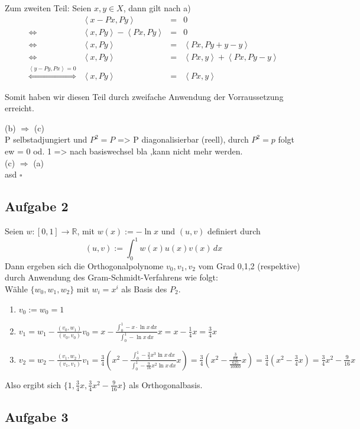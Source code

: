 \documentclass[11pt,a4paper,ngerman]{article}
\begin{document}
Zum zweiten Teil:
Seien $x, y \in X$, dann gilt nach a)
\begin{equation*}\begin{array}{crcl}
& \left\langle x - Px, Py \right\rangle &=& 0\\
\Leftrightarrow &
\left\langle x , Py \right\rangle - \left\langle Px, Py \right\rangle &=& 0\\
\Leftrightarrow &
\left\langle x, Py \right\rangle &=& \left\langle Px, Py + y - y \right\rangle\\
\Leftrightarrow &
\left\langle x , Py \right\rangle &=&
\left\langle Px, y \right\rangle + \left\langle Px, Py - y \right\rangle\\
\stackrel{\left\langle y - Py, Px \right\rangle = 0}{\Leftrightarrow}&
\left\langle x , Py \right\rangle &=& \left\langle Px , y \right\rangle
\end{array}\end{equation*}

Somit haben wir diesen Teil durch zweifache Anwendung der Vorraussetzung erreicht.

(b) $\Rightarrow$ (c) \\
P selbstadjungiert und $P^2 = P$ => P diagonalisierbar (reell), durch $P^2 = p$ folgt ew = 0 od. 1 => nach basiswechsel bla ,kann nicht mehr werden. \\
(c) $\Rightarrow$ (a) \\
asd 
\mbox{} \hfill $\square$

\subsection*{Aufgabe 2}
Seien $w: [0,1] \to \mathbb{R}$, mit $w(x) := - \ln x$ und $(u,v)$ definiert durch
$$ (u,v) := \int_0^1 w(x)u(x)v(x) \, dx $$
Dann ergeben sich die Orthogonalpolynome $v_0,v_1,v_2$ vom Grad 0,1,2 (respektive) durch Anwendung
des Gram-Schmidt-Verfahrens wie folgt: \\

Wähle $\{w_0, w_1, w_2\}$ mit $w_i = x^i$ als Basis des $P_2$.
\begin{enumerate}
\item $v_0 := w_0 = 1$ 
\item $v_1 = w_1 - \frac{(v_0,w_1)}{(v_0,v_0)} v_0 = x - \frac{\int_0^1 - x \cdot \ln x \, dx}{\int_0^1 - \ln x \, dx} x
           = x - \frac{1}{4} x = \frac{3}{4}x$
\item $v_2 = w_2 - \frac{(v_1,w_2)}{(v_1,v_1)} v_1
           = \frac{3}{4} \left( x^2 - \frac{\int_0^1 - \frac{3}{4}x^3 \ln x \, dx }{ \int_0^1 - \frac{9}{16}x^2\ln x \, dx} x \right)
           = \frac{3}{4} \left(x^2 - \frac{\frac{3}{64}}{\frac{625}{10000}} x\right)
           = \frac{3}{4} \left(x^2 - \frac{3}{4} x\right) = \frac{3}{4}x^2 - \frac{9}{16}x$
\end{enumerate}

Also ergibt sich $\{1,\frac{3}{4}x,\frac{3}{4}x^2 - \frac{9}{16}x \}$ als Orthogonalbasis.
\subsection*{Aufgabe 3}



\label{LastPage}
\end{document}
